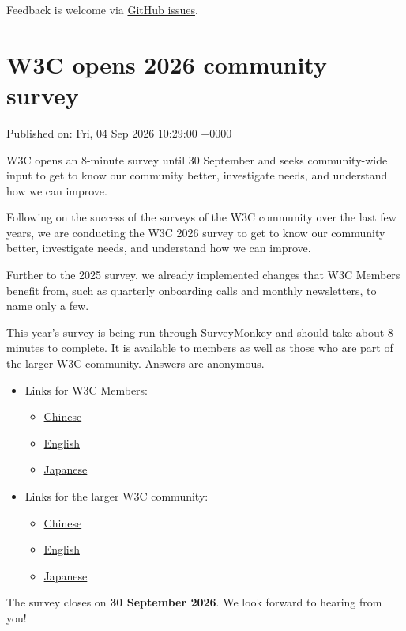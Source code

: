 \documentclass[11pt,a4paper]{article}
\begin{document}
Feedback is welcome via \href{https://github.com/w3c/webauthn/issues}{GitHub issues}.

\section{W3C opens 2026 community survey}

Published on: Fri, 04 Sep 2026 10:29:00 +0000

W3C opens an 8-minute survey until 30 September and seeks community-wide input to get to know our community better, investigate needs, and understand how we can improve.

Following on the success of the surveys of the W3C community over the last few years, we are conducting the W3C 2026 survey to get to know our community better, investigate needs, and understand how we can improve.

Further to the 2025 survey, we already implemented changes that W3C Members benefit from, such as quarterly onboarding calls and monthly newsletters, to name only a few.

This year's survey is being run through SurveyMonkey and should take about 8 minutes to complete. It is available to members as well as those who are part of the larger W3C community. Answers are anonymous.

\begin{itemize}
\item Links for W3C Members:
  \begin{itemize}
\item \href{https://www.surveymonkey.com/r/FFXQNHL}{Chinese}
\item \href{https://www.surveymonkey.com/r/8F55Y7K}{English}
\item \href{https://www.surveymonkey.com/r/7KFXNFB}{Japanese}
  \end{itemize}
\item Links for the larger W3C community:
  \begin{itemize}
\item \href{https://www.surveymonkey.com/r/83CQVX9}{Chinese}
\item \href{https://www.surveymonkey.com/r/FFGP6DL}{English}
\item \href{https://www.surveymonkey.com/r/FF9V2DH}{Japanese}
  \end{itemize}
\end{itemize}

The survey closes on \textbf{30 September 2026}. We look forward to hearing from you!
\end{document}
